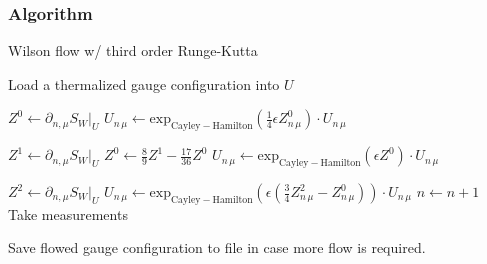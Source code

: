\documentclass[a4paper,10pt]{article}
\begin{document}
\subsubsection{Algorithm}
\begin{algorithm}[H]
\caption{Wilson flow w/ third order Runge-Kutta}\label{alg:Wilson_flow}
\begin{algorithmic}
\Ensure
\State Load a thermalized gauge configuration into $U$

	\State $Z^0 \gets \partial_{n, \mu}S_W\big|_{U}$
	\State $U_{n\,\mu} \gets \operatorname{exp_{Cayley-Hamilton}}\left( \frac{1}{4}\epsilon Z^0_{n\,\mu} \right)\cdot U_{n\,\mu}$
	\EndFor
	
		\State $Z^1 \gets \partial_{n, \mu}S_W\big|_{U}$
		\State $Z^0 \gets \frac{8}{9}Z^1 -\frac{17}{36}Z^0$
	\State $U_{n\,\mu} \gets \operatorname{exp_{Cayley-Hamilton}}\left( \epsilon Z^0 \right)\cdot U_{n\,\mu}$
	\EndFor
	
		\State $Z^2 \gets \partial_{n, \mu}S_W\big|_{U}$
	\State $U_{n\,\mu} \gets \operatorname{exp_{Cayley-Hamilton}}\left( \epsilon \left( \frac{3}{4}Z^2_{n\,\mu} - Z^0_{n\,\mu} \right) \right)\cdot U_{n\,\mu}$
	\EndFor
	\State $n\gets n+1$
	\State Take measurements
\EndWhile
    
\State Save flowed gauge configuration to file in case more flow is required.

\end{algorithmic}
\end{algorithm}
\end{document}
